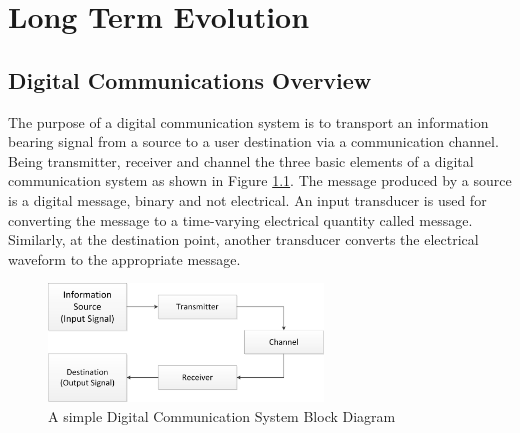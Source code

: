 \chapter{Long Term Evolution}
\label{chap:lte}

\section{Digital Communications Overview}
\label{lte:digicomm}

The purpose of a digital communication system is to transport an information
bearing signal from a source to a user destination via a communication channel.
Being transmitter, receiver and channel the three basic elements of a digital
communication system as shown in Figure \ref{fig:digicomsimple}. The message
produced by a source is a digital message, binary and not electrical. An input
transducer is used for converting the message to a time-varying electrical
quantity called message. Similarly, at the destination point, another transducer
converts the electrical waveform to the appropriate message.


\begin{figure}[htbp]
    \centering
    \includegraphics[width=0.65\textwidth]{./figures/digicom_simple}
    \caption{ A simple Digital Communication System Block Diagram
    \label{fig:digicomsimple}}
\end{figure}


